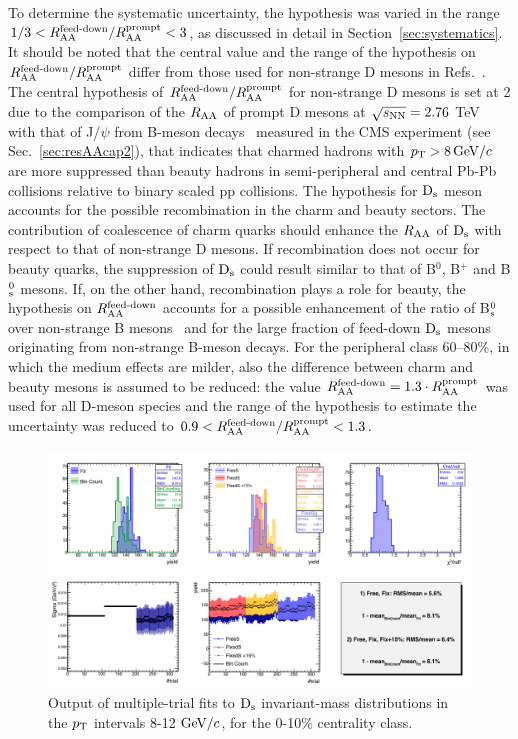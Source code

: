 To determine the systematic uncertainty, the hypothesis
was varied in the range $1/3<R_{\rm AA}^{\textnormal{feed-down}}/R_{\rm AA}^{\rm prompt}<3$, as 
discussed in detail in Section~\ref{sec:systematics}.
It should be noted that the central value and the range of the hypothesis
on $R_{\rm AA}^{\textnormal{feed-down}}/R_{\rm AA}^{\rm prompt}$ differ from those used for
non-strange D mesons in Refs.~\cite{ALICE-PUBLIC-2017-003,Adam:2015sza}. The 
central hypothesis of $R_{\rm AA}^{\textnormal{feed-down}}/R_{\rm AA}^{\rm prompt}$ for non-strange
D mesons is set at 2  due to the comparison of the $R_{\rm AA}$ of prompt D mesons at 
$\sqrt{s_{\rm NN}} = 2.76$ TeV~\cite{Adam:2015nna} with that of J/$\psi$ from B-meson decays~\cite{Khachatryan:2016ypw} 
measured in the CMS experiment (see Sec.~\ref{sec:resAAcap2}), that indicates that charmed hadrons 
with $p_{\rm T} > 8 \, \mathrm{GeV}/c$ are more suppressed than beauty hadrons in semi-peripheral and central
Pb-Pb collisions relative to binary scaled pp collisions. The hypothesis for ${\rm D_s}$ meson
accounts for the possible recombination in the charm and beauty sectors.
The contribution of coalescence of charm quarks should enhance the $R_{\rm AA}$ of
${\rm D_s}$ with respect to that of non-strange D mesons. If recombination does not occur
for beauty quarks, the suppression of ${\rm D_s}$ could result similar to that of  B$^0$, B$^+$ and B$^0_{\rm s}$
mesons. If, on the other hand, recombination plays a role for beauty,
the hypothesis on $R_{\rm AA}^{\textnormal{feed-down}}$ accounts for a possible enhancement 
of the ratio of B$^0_{\rm s}$ over non-strange B mesons~\cite{TAMULHC}
and for the large fraction of feed-down ${\rm D_s}$ mesons originating from non-strange B-meson decays.
For the peripheral class 60--80\%, in which the medium effects are milder, 
also the difference between charm and beauty mesons is assumed to be 
reduced: the value $R_{\rm AA}^{\textnormal{feed-down}}=1.3\cdot R_{\rm AA}^{\rm prompt}$ 
was used for all D-meson species and the range of the hypothesis to estimate the
uncertainty was reduced to $0.9<R_{\rm AA}^{\textnormal{feed-down}}/R_{\rm AA}^{\rm prompt}<1.3$. 

\begin{figure}[!htb]
 \begin{center}
\includegraphics[width=15.cm]{./FigCap5/MT_Pt812.png}
\end{center}
 \caption{Output of multiple-trial fits to ${\rm D_s}$ invariant-mass distributions in the $p_{\rm T}$ intervals 8-12 $\mathrm{GeV}/c$, for the 0-10$\%$ centrality class.}
 \label{fig:multitrial_Ds_010}
\end{figure}


